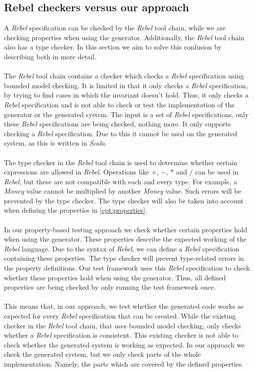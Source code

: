 \subsection{Rebel checkers versus our approach}
A \textit{Rebel} specification can be checked by the \textit{Rebel} tool chain,
while we are checking properties when using the generator. Additionally, the
\textit{Rebel} tool chain also has a type checker. In this section we aim to
solve this confusion by describing both in more detail.\\
\\
The \textit{Rebel} tool chain contains a checker which checks a \textit{Rebel} specification using bounded model checking. It is limited in that it only checks a \textit{Rebel} specification, by trying to find cases in which the invariant doesn't hold. Thus, it only checks a \textit{Rebel} specification and is not able to check or test the implementation of the generator or the generated system. The input is a set of \textit{Rebel} specifications, only these \textit{Rebel} specifications are being checked, nothing more. It only supports checking a \textit{Rebel} specification. Due to this it cannot be used on the generated system, as this is written in \textit{Scala}.\\
\\
The type checker in the \textit{Rebel} tool chain is used to determine whether certain expressions are allowed in \textit{Rebel}. Operations like \textit{$+$}, \textit{$-$}, \textit{$*$} and \textit{$/$} can be used in \textit{Rebel}, but these are not compatible with each and every type. For example, a \textit{Money} value cannot be multiplied by another \textit{Money} value. Such errors will be prevented by the type checker. The type checker will also be taken into account when defining the properties in \autoref{cpt:properties}.\\
\\
In our property-based testing approach we check whether certain properties hold when using the generator. These properties describe the expected working of the \textit{Rebel} language. Due to the syntax of \textit{Rebel}, we can define a \textit{Rebel} specification containing these properties. The type checker will prevent type-related errors in the property definitions. Our test framework uses this \textit{Rebel} specification to check whether these properties hold when using the generator. Thus, all defined properties are being checked by only running the test framework once.\\
\\
This means that, in our approach, we test whether the generated code works as expected for every \textit{Rebel} specification that can be created. While the existing checker in the \textit{Rebel} tool chain, that uses bounded model checking, only checks whether a \textit{Rebel} specification is consistent. This existing checker is not able to check whether the generated system is working as expected. In our approach we check the generated system, but we only check parts of the whole implementation. Namely, the parts which are covered by the defined properties.

